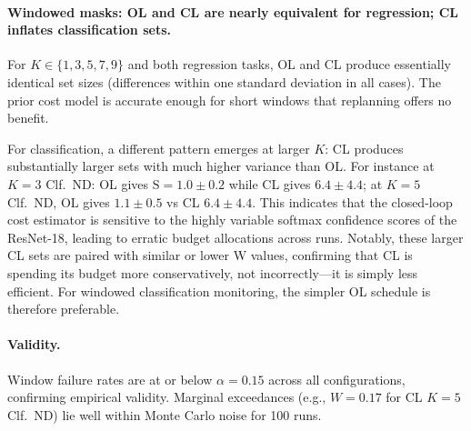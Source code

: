 \documentclass{uai2026} %
\newcommand{\1}{\mathbf{1}}
\begin{document}
\paragraph{Windowed masks: OL and CL are nearly equivalent for regression; CL inflates classification sets.}
For $K \in \{1,3,5,7,9\}$ and both regression tasks, OL and CL produce essentially
identical set sizes (differences within one standard deviation in all cases).
The prior cost model is accurate enough for short windows that replanning offers no benefit.

For classification, a different pattern emerges at larger $K$: CL produces substantially larger sets with much higher variance than OL.
For instance at $K{=}3$ Clf.\ ND: OL gives $\mathrm{S}{=}1.0{\pm}0.2$ while CL gives $6.4{\pm}4.4$; at $K{=}5$ Clf.\ ND, OL gives $1.1{\pm}0.5$ vs CL $6.4{\pm}4.4$.
This indicates that the closed-loop cost estimator is sensitive to the highly variable softmax
confidence scores of the ResNet-18, leading to erratic budget allocations across runs.
Notably, these larger CL sets are paired with similar or lower W values, confirming that
CL is spending its budget more conservatively, not incorrectly---it is simply less efficient.
For windowed classification monitoring, the simpler OL schedule is therefore preferable.

\paragraph{Validity.}
Window failure rates are at or below $\alpha{=}0.15$ across all configurations, confirming empirical validity. Marginal exceedances (e.g., $W{=}0.17$ for CL $K{=}5$ Clf.\ ND) lie well within Monte Carlo noise for 100 runs.
\end{document}
